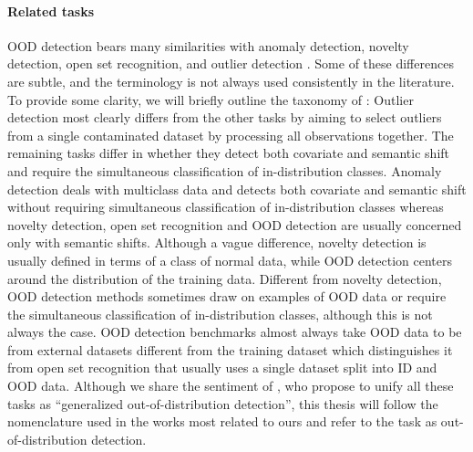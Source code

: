 \paragraph{Related tasks} OOD detection bears many similarities with anomaly detection, novelty detection, open set recognition, and outlier detection \parencite{yang_generalized_2022}. %
Some of these differences are subtle, and the terminology is not always used consistently in the literature. To provide some clarity, we will briefly outline the taxonomy of \textcite{yang_generalized_2022}: 
Outlier detection most clearly differs from the other tasks by aiming to select outliers from a single contaminated dataset by processing all observations together. 
The remaining tasks differ in whether they detect both covariate and semantic shift and require the simultaneous classification of in-distribution classes. %
Anomaly detection deals with multiclass data and detects both covariate and semantic shift without requiring simultaneous classification of in-distribution classes whereas novelty detection, open set recognition and OOD detection are usually concerned only with semantic shifts. 
Although a vague difference, novelty detection is usually defined in terms of a class of normal data, while OOD detection centers around the distribution of the training data. Different from novelty detection, OOD detection methods sometimes draw on examples of OOD data or require the simultaneous classification of in-distribution classes, although this is not always the case. 
OOD detection benchmarks almost always take OOD data to be from external datasets different from the training dataset which distinguishes it from open set recognition that usually uses a single dataset split into ID and OOD data. 
Although we share the sentiment of \textcite{yang_generalized_2022}, who propose to unify all these tasks as ``generalized out-of-distribution detection'', this thesis will follow the nomenclature used in the works most related to ours and refer to the task as out-of-distribution detection.

